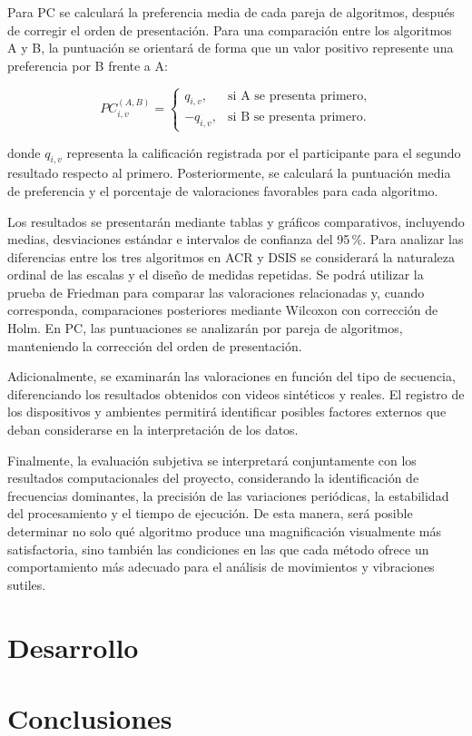 Para PC se calculará la preferencia media de cada pareja de algoritmos, después de corregir el orden de presentación. Para una comparación entre los algoritmos A y B, la puntuación se orientará de forma que un valor positivo represente una preferencia por B frente a A:

\begin{equation}
PC_{i,v}^{(A,B)}=
\begin{cases}
q_{i,v}, & \text{si A se presenta primero},\\
-q_{i,v}, & \text{si B se presenta primero}.
\end{cases}
\end{equation}

donde $q_{i,v}$ representa la calificación registrada por el participante para el segundo resultado respecto al primero. Posteriormente, se calculará la puntuación media de preferencia y el porcentaje de valoraciones favorables para cada algoritmo.

Los resultados se presentarán mediante tablas y gráficos comparativos, incluyendo medias, desviaciones estándar e intervalos de confianza del 95\,\%. Para analizar las diferencias entre los tres algoritmos en ACR y DSIS se considerará la naturaleza ordinal de las escalas y el diseño de medidas repetidas. Se podrá utilizar la prueba de Friedman para comparar las valoraciones relacionadas y, cuando corresponda, comparaciones posteriores mediante Wilcoxon con corrección de Holm. En PC, las puntuaciones se analizarán por pareja de algoritmos, manteniendo la corrección del orden de presentación.

Adicionalmente, se examinarán las valoraciones en función del tipo de secuencia, diferenciando los resultados obtenidos con videos sintéticos y reales. El registro de los dispositivos y ambientes permitirá identificar posibles factores externos que deban considerarse en la interpretación de los datos.

Finalmente, la evaluación subjetiva se interpretará conjuntamente con los resultados computacionales del proyecto, considerando la identificación de frecuencias dominantes, la precisión de las variaciones periódicas, la estabilidad del procesamiento y el tiempo de ejecución. De esta manera, será posible determinar no solo qué algoritmo produce una magnificación visualmente más satisfactoria, sino también las condiciones en las que cada método ofrece un comportamiento más adecuado para el análisis de movimientos y vibraciones sutiles.

\section{Desarrollo}

\section{Conclusiones}
